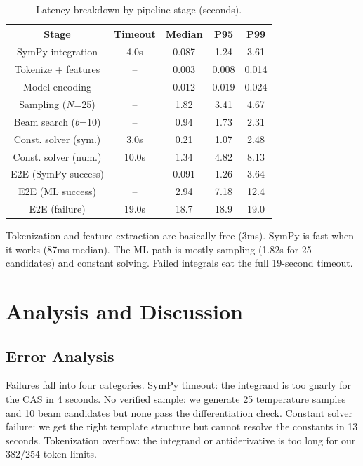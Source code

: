\documentclass[conference]{IEEEtran}
\begin{document}
\begin{table}[htbp]
\caption{Latency breakdown by pipeline stage (seconds).}
\begin{center}
\begin{tabular}{|c|c|c|c|c|}
\hline
\textbf{Stage} & \textbf{Timeout} & \textbf{Median} & \textbf{P95} & \textbf{P99} \\
\hline
SymPy integration & 4.0s & 0.087 & 1.24 & 3.61 \\
\hline
Tokenize + features & -- & 0.003 & 0.008 & 0.014 \\
\hline
Model encoding & -- & 0.012 & 0.019 & 0.024 \\
\hline
Sampling ($N$=25) & -- & 1.82 & 3.41 & 4.67 \\
\hline
Beam search ($b$=10) & -- & 0.94 & 1.73 & 2.31 \\
\hline
Const. solver (sym.) & 3.0s & 0.21 & 1.07 & 2.48 \\
\hline
Const. solver (num.) & 10.0s & 1.34 & 4.82 & 8.13 \\
\hline
E2E (SymPy success) & -- & 0.091 & 1.26 & 3.64 \\
\hline
E2E (ML success) & -- & 2.94 & 7.18 & 12.4 \\
\hline
E2E (failure) & 19.0s & 18.7 & 18.9 & 19.0 \\
\hline
\end{tabular}
\label{tab:latency}
\end{center}
\end{table}

Tokenization and feature extraction are basically free (3ms). SymPy is fast when it works (87ms median). The ML path is mostly sampling (1.82s for 25 candidates) and constant solving. Failed integrals eat the full 19-second timeout.

\section{Analysis and Discussion}

\subsection{Error Analysis}

Failures fall into four categories. SymPy timeout: the integrand is too gnarly for the CAS in 4 seconds. No verified sample: we generate 25 temperature samples and 10 beam candidates but none pass the differentiation check. Constant solver failure: we get the right template structure but cannot resolve the constants in 13 seconds. Tokenization overflow: the integrand or antiderivative is too long for our 382/254 token limits.
\end{document}
